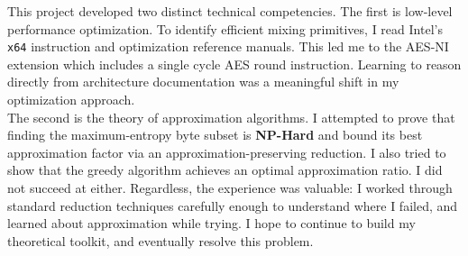 This project developed two distinct technical competencies. The first is low-level performance optimization. To identify efficient mixing primitives, I read 
Intel's \texttt{x64} instruction and optimization reference manuals. This led me to the AES-NI extension which includes a single cycle AES round instruction. 
Learning to reason directly from architecture documentation was a meaningful shift in my optimization approach. \\

\noindent
The second is the theory of approximation algorithms. I attempted to prove that finding the maximum-entropy byte subset is \textbf{NP-Hard} and bound its 
best approximation factor via an approximation-preserving reduction. I also tried to show that the greedy algorithm achieves an optimal approximation ratio. I 
did not succeed at either. Regardless, the experience was valuable: I worked through standard reduction techniques carefully enough to understand where I 
failed, and learned about approximation while trying. I hope to continue to build my theoretical toolkit, and eventually resolve this problem.


